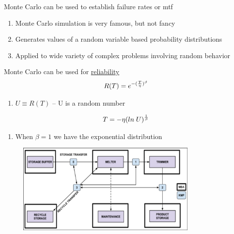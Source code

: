 \documentclass[aspectratio=1610,pdftex,dvipsnames,compress,xcolor={dvipsnames}]{beamer}
\newcommand{\acs}{\acrshort} %
\begin{document}
\addtocounter{framenumber}{-1}
\begin{frame}{Monte Carlo can be used to establish failure rates or \acs{mtf}}
    \begin{enumerate}[series=outerlist,topsep=0pt,itemsep=21pt,leftmargin=*,label=(\arabic*)]
        \item[]Monte Carlo simulation is very famous, but not fancy
        \item[]Generates values of a random variable based probability distributions
        \item[]Applied to wide variety of complex problems involving random behavior
    \end{enumerate}
\end{frame}


\begin{frame}{Monte Carlo can be used for \href{https://uidaho.pressbooks.pub/riskassessment/chapter/failure-rates-and-reliability/}{reliability}}
    \begin{equation}
        \LARGE
        R(T) = e^{-(\frac{T}{\eta})^{\beta}}
    \end{equation}

    \begin{enumerate}[series=outerlist,topsep=0pt,itemsep=3pt,leftmargin=*,label=(\arabic*)]
        \item[]$U \equiv R(T)$ -- U is a random number
    \end{enumerate}

    \begin{equation}
        \LARGE
        T = -\eta(ln \; U)^{\frac{1}{\beta}}
    \end{equation}

    \begin{enumerate}[series=outerlist,topsep=0pt,itemsep=3pt,leftmargin=*,label=(\arabic*)]
        \item[]When $\beta = 1$ we have the exponential distribution
    \end{enumerate}
\end{frame}


\begin{frame}{}
    \begin{figure}
        \centering
        \includegraphics[width=0.80\textwidth]{des_fuel.fabrication.jpg}
    \end{figure}
\end{frame}
\end{document}
